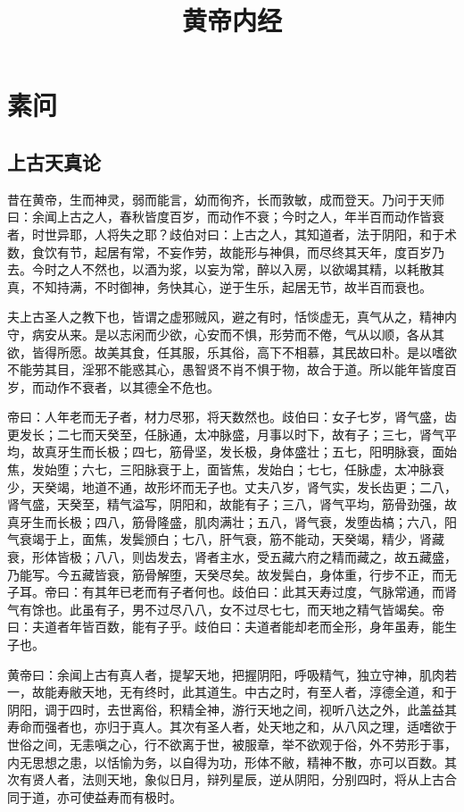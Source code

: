 \documentclass{ctexart}
\title{黄帝内经}
\date{}
\begin{document}
\maketitle

\section{素问}

\subsection{上古天真论}

昔在黄帝，生而神灵，弱而能言，幼而徇齐，长而敦敏，成而登天。乃问于天师曰：余闻上古之人，春秋皆度百岁，而动作不衰；今时之人，年半百而动作皆衰者，时世异耶，人将失之耶？歧伯对曰：上古之人，其知道者，法于阴阳，和于术数，食饮有节，起居有常，不妄作劳，故能形与神俱，而尽终其天年，度百岁乃去。今时之人不然也，以酒为浆，以妄为常，醉以入房，以欲竭其精，以耗散其真，不知持满，不时御神，务快其心，逆于生乐，起居无节，故半百而衰也。

夫上古圣人之教下也，皆谓之虚邪贼风，避之有时，恬惔虚无，真气从之，精神内守，病安从来。是以志闲而少欲，心安而不惧，形劳而不倦，气从以顺，各从其欲，皆得所愿。故美其食，任其服，乐其俗，高下不相慕，其民故曰朴。是以嗜欲不能劳其目，淫邪不能惑其心，愚智贤不肖不惧于物，故合于道。所以能年皆度百岁，而动作不衰者，以其德全不危也。

帝曰：人年老而无子者，材力尽邪，将天数然也。歧伯曰：女子七岁，肾气盛，齿更发长；二七而天癸至，任脉通，太冲脉盛，月事以时下，故有子；三七，肾气平均，故真牙生而长极；四七，筋骨坚，发长极，身体盛壮；五七，阳明脉衰，面始焦，发始堕；六七，三阳脉衰于上，面皆焦，发始白；七七，任脉虚，太冲脉衰少，天癸竭，地道不通，故形坏而无子也。丈夫八岁，肾气实，发长齿更；二八，肾气盛，天癸至，精气溢写，阴阳和，故能有子；三八，肾气平均，筋骨劲强，故真牙生而长极；四八，筋骨隆盛，肌肉满壮；五八，肾气衰，发堕齿槁；六八，阳气衰竭于上，面焦，发鬓颁白；七八，肝气衰，筋不能动，天癸竭，精少，肾藏衰，形体皆极；八八，则齿发去，肾者主水，受五藏六府之精而藏之，故五藏盛，乃能写。今五藏皆衰，筋骨解堕，天癸尽矣。故发鬓白，身体重，行步不正，而无子耳。帝曰：有其年已老而有子者何也。歧伯曰：此其天寿过度，气脉常通，而肾气有馀也。此虽有子，男不过尽八八，女不过尽七七，而天地之精气皆竭矣。帝曰：夫道者年皆百数，能有子乎。歧伯曰：夫道者能却老而全形，身年虽寿，能生子也。

黄帝曰：余闻上古有真人者，提挈天地，把握阴阳，呼吸精气，独立守神，肌肉若一，故能寿敝天地，无有终时，此其道生。中古之时，有至人者，淳德全道，和于阴阳，调于四时，去世离俗，积精全神，游行天地之间，视听八达之外，此盖益其寿命而强者也，亦归于真人。其次有圣人者，处天地之和，从八风之理，适嗜欲于世俗之间，无恚嗔之心，行不欲离于世，被服章，举不欲观于俗，外不劳形于事，内无思想之患，以恬愉为务，以自得为功，形体不敝，精神不散，亦可以百数。其次有贤人者，法则天地，象似日月，辩列星辰，逆从阴阳，分别四时，将从上古合同于道，亦可使益寿而有极时。
\end{document}
